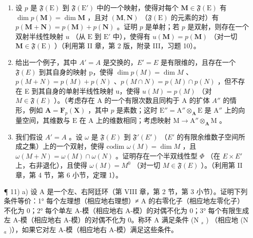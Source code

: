 \begin{enumerate}
\def\labelenumi{\alph{enumi})}
\item
  设 \(p\) 是 \(\mathfrak{F}(\mathrm{E})\) 到 \(\mathfrak{F}(\mathrm{E}')\) 中的一个映射，使得对每个 \(\mathbf{M} \in \mathfrak{F}(\mathrm{E})\) 有 \(\dim p(\mathbf{M}) = \dim \mathbf{M}\) ，且对 \((\mathbf{M}, \mathbf{N})\) （\(\mathfrak{F}(\mathrm{E})\) 的元素的对）有 \(p(\mathbf{M} + \mathbf{N}) = p(\mathbf{M}) + p(\mathbf{N})\) 。证明 \(p\) 是单射；若 \(p\) 是双射，则存在一个双射半线性映射 \(u\) （从 \(\mathrm{E}\) 到 \(\mathrm{E}'\) 中），使得有 \(u(\mathbf{M}) = p(\mathbf{M})\) （对一切 \(\mathbf{M} \in \mathfrak{F}(\mathrm{E})\) ）（利用第 II 章，第 2 版，附录 III，习题 10）。
\item
  给出一个例子，其中 \(A' = A\) 是交换的，\(E' = E\) 是有限维的，且存在一个 \(\mathfrak{F}(E)\) 到其自身的映射 p，使得 \(\dim p(M) = \dim M\) 、\(p(M + N) = p(M) + p(N)\) 、\(p(M \cap N) = p(M) \cap p(N)\) ，但不存在 E 到其自身的单射半线性映射 u，使得 \(u(M) = p(M)\) （对 \(M \in \mathfrak{F}(E)\) ）。（考虑存在 A 的一个有限次数且同构于 A 的扩体 \(A''\) 的情形，例如 \(\mathbf{A} = \mathbf{F}_{p}(\mathbf{X})\) ，其中 \(p\) 是素数；这时 \(\mathrm{E}'' = \mathrm{A}'' \otimes_{\mathbf{A}} \mathrm{E}\) 是 \(\mathrm{A}''\) 上的向量空间，其维数与 \(\mathrm{E}\) 在 \(\mathrm{A}\) 上的维数相同；考虑映射 \(\mathrm{M} \to \mathrm{A}'' \otimes_{\mathbf{A}} \mathrm{M}\) 。
\item
  我们假设 \(A' = A\) 。设 \(\omega\) 是 \(\mathfrak{F}(E)\) 到 \(\mathfrak{F}'(E')\) （\(E'\) 的有限余维数子空间所成之集）上的一个双射，使得 \(\text{codim } \omega(M) = \dim M\) ，且 \(\omega(M + N) = \omega(M) \cap \omega(N)\) 。证明存在一个半双线性型 \(\Phi\) （在 \(E \times E'\) 上，右非退化），且使得 \(\omega(M) = M^0\) （对一切 \(M \in \mathfrak{F}(E)\) ）。（利用第 II 章，第 4 节，第 6 小节，定理 1）。
\end{enumerate}

¶ 11) a) 设 A 是一个左、右阿廷环（第 VIII 章，第 2 节，第 3 小节）。证明下列条件等价：1° 每个左理想（相应地右理想）≠ A 的右零化子（相应地左零化子）不化为 0；2° 每个单左 A-模（相应地右 A-模）的对偶不化为 0；3° 每个有限生成左 A-模（相应地右 A-模）的对偶不化为 0。称环 A 满足条件 (N \(_{s}\) ) （相应地 (N \(_{a}\) )），如果它对左 A-模（相应地右 A-模）满足这些条件。

